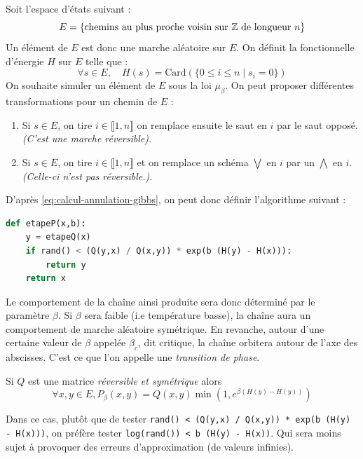 \begin{example}
    Soit l'espace d'états suivant : 
        $$ E = \left\{ \text{chemins au plus proche voisin sur } \mathbb{Z} \text{ de longueur } n \right\} $$ 
    Un élément de $E$ est donc une marche aléatoire sur $E$. On définit la fonctionnelle 
    d'énergie $H$ sur $E$ telle que : 
        $$ \forall s \in E, \quad H(s) = \text{Card}(\{0 \leqslant i \leqslant n \mid s_i = 0\}) $$ 
    On souhaite simuler un élément de $E$ sous la loi $ \mu_\beta$. On peut proposer
    différentes transformations pour un chemin de $E$ : 
    \begin{enumerate} 
        \item Si $s \in E$, on tire $i \in \llbracket 1, n \rrbracket$ on remplace 
        ensuite le saut en $i$ par le saut opposé. 
        \emph{(C'est une marche réversible).}
        \item Si $s \in E$, on tire $i \in \llbracket 1, n \rrbracket$ et 
        on remplace un schéma $ \bigvee $ en $i$ par un $ \bigwedge $ en $i$.
         \emph{(Celle-ci n'est pas réversible.).}
    \end{enumerate}
    D'après \ref{eq:calcul-annulation-gibbs}, on peut donc définir l'algorithme suivant : 

    \begin{lstlisting}[language=Python]
def etapeP(x,b):
    y = etapeQ(x)
    if rand() < (Q(y,x) / Q(x,y)) * exp(b (H(y) - H(x))): 
        return y
    return x
    \end{lstlisting}
    
    Le comportement de la chaîne ainsi produite sera donc déterminé par 
    le paramètre $ \beta$. 
    Si $ \beta$ sera faible (i.e température basse), la chaîne aura un comportement 
    de marche aléatoire symétrique. En revanche, autour d'une certaine valeur 
    de $ \beta$ appelée $ \beta_c$, dit critique, la chaîne orbitera autour 
    de l'axe des abscisses. C'est ce que l'on appelle une \emph{transition de phase}.
\end{example}

\begin{remark}
    Si $Q$ est une matrice \emph{réversible et symétrique} alors 
        $$ \forall x,y \in E, P_\beta(x,y) = Q(x,y) \min \left(1, e^{\beta (H(y) - H(y))}\right)$$

    Dans ce cas, plutôt que de tester \texttt{rand() < (Q(y,x) / Q(x,y)) * exp(b (H(y) - H(x)))}, 
    on préfère tester \texttt{log(rand()) < b (H(y) - H(x))}. Qui sera moins 
    sujet à provoquer des erreurs d'approximation (de valeurs infinies).
\end{remark}

